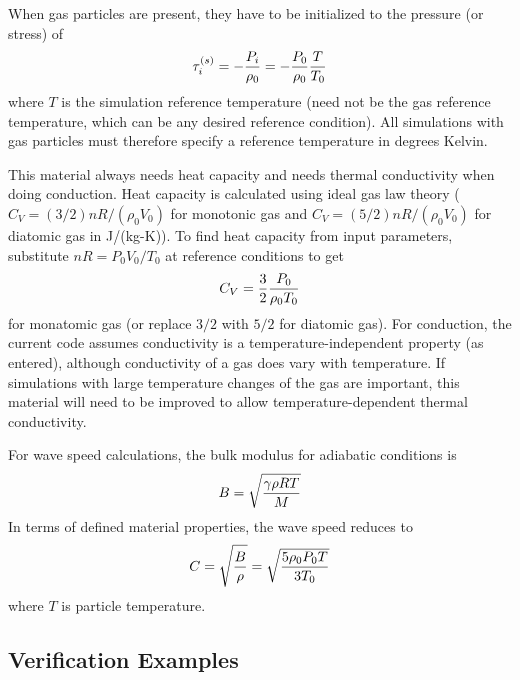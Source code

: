 \documentclass[11pt]{article}
\begin{document}
When gas particles are present, they have to be initialized to the pressure (or stress) of
\begin{equation}
     \tau_i^{(s)} =  - {P_i\over \rho_0} = - {P_0\over \rho_0} {T\over T_0}
\end{equation}
where $T$ is the simulation reference temperature (need not be the gas reference temperature, which can be any desired reference condition). All simulations with gas particles must therefore specify a reference temperature in degrees Kelvin.

This material always needs heat capacity and needs thermal conductivity when doing conduction. Heat capacity is calculated using ideal gas law theory ($C_V=(3/2)nR/(\rho_0 V_0)$ for monotonic gas and $C_V=(5/2)nR/(\rho_0 V_0)$ for diatomic gas in J/(kg-K)). To find heat capacity from input parameters, substitute $nR = P_0V_0/T_0$ at reference conditions to get
\begin{equation}
     C_V =  {3\over 2} {P_0 \over \rho_0T_0}
\end{equation}
for monatomic gas (or replace $3/2$ with $5/2$ for diatomic gas). For conduction, the current code assumes conductivity is a temperature-independent property (as entered), although conductivity of a gas does vary with temperature. If simulations with large temperature changes of the gas are important, this material will need to be improved to allow temperature-dependent thermal conductivity.

For wave speed calculations, the bulk modulus for adiabatic conditions is
\begin{equation}
   B = \sqrt{\gamma\rho R T\over M}
\end{equation}
In terms of defined material properties, the wave speed reduces to
\begin{equation}
   C = \sqrt{B\over\rho} = \sqrt{{5\rho_0P_0T\over 3T_0}}
\end{equation}
where $T$ is particle temperature.


\subsection{Verification Examples}
\end{document}
